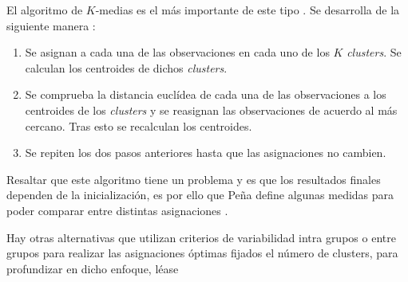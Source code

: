 \noindent El algoritmo de $K$-medias es el más importante de este tipo \cite{Johnson 2007}. Se desarrolla de la siguiente manera  :
\begin{enumerate}
\item Se asignan a cada una de las observaciones en cada uno de los $K$ \emph{clusters}. Se calculan los centroides de dichos \emph{clusters}.
\item Se comprueba la distancia euclídea de cada una de las observaciones a los centroides de los \emph{clusters} y se reasignan las observaciones de acuerdo al  más cercano. Tras esto se recalculan los centroides.
\item Se repiten los dos pasos anteriores hasta que las asignaciones no cambien. 
\end{enumerate}

\noindent Resaltar que este algoritmo tiene un problema y es que los resultados finales dependen de la inicialización, es por ello que Peña define algunas medidas para poder comparar entre distintas asignaciones \cite{Peña 2002}. 

\noindent Hay otras alternativas que utilizan criterios de variabilidad intra grupos o entre grupos para realizar las asignaciones óptimas fijados el número de clusters, para profundizar en dicho enfoque, léase \cite{Everitt 2011, Peña 2002, Hartigan 1975}






